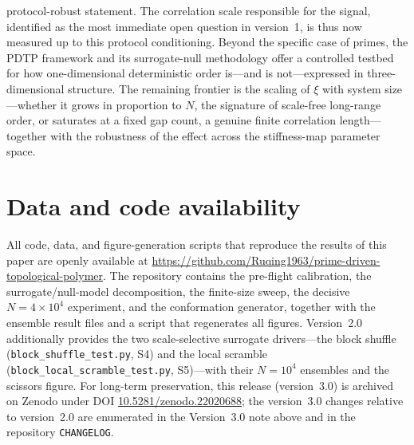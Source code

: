 \documentclass[11pt]{article}
\begin{document}
protocol-robust statement. The correlation scale responsible for the signal,
identified as the most immediate open question in version~1, is thus now measured
up to this protocol conditioning. Beyond the specific case of primes,
the PDTP framework and its surrogate-null methodology offer a controlled testbed for
how one-dimensional deterministic order is---and is not---expressed in
three-dimensional structure. The remaining frontier is the scaling of $\xi$ with
system size---whether it grows in proportion to $N$, the signature of scale-free
long-range order, or saturates at a fixed gap count, a genuine finite correlation
length---together with the robustness of the effect across the stiffness-map
parameter space.

\section*{Data and code availability}
All code, data, and figure-generation scripts that reproduce the results of this paper
are openly available at
\url{https://github.com/Ruqing1963/prime-driven-topological-polymer}. The repository
contains the pre-flight calibration, the surrogate/null-model decomposition, the
finite-size sweep, the decisive $N = 4\times10^4$ experiment, and the conformation
generator, together with the ensemble result files and a script that regenerates all
figures. Version~2.0 additionally provides the two scale-selective surrogate
drivers---the block shuffle (\texttt{block\_shuffle\_test.py}, S4) and the local
scramble (\texttt{block\_local\_scramble\_test.py}, S5)---with their $N = 10^4$
ensembles and the scissors figure. For long-term preservation, this release
(version~3.0) is archived on Zenodo under DOI
\href{https://doi.org/10.5281/zenodo.22020688}{10.5281/zenodo.22020688};
the version~3.0 changes relative to version~2.0 are enumerated in the Version~3.0
note above and in the repository \texttt{CHANGELOG}.
\end{document}
